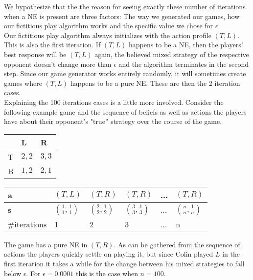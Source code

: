 \documentclass[10pt,a4paper]{article}
\begin{document}
We hypothesize that the the reason for seeing exactly these number of iterations when a NE is present are three factors: The way we generated our games, how our fictitious play algorithm works and the specific value we chose for $\epsilon$.\\
Our fictitious play algorithm always initializes with the action profile $(T,L)$. This is also the first iteration. If $(T,L)$ happens to be a NE, then the players' best response will be $(T,L)$ again, the believed mixed strategy of the respective opponent doesn't change more than $\epsilon$ and the algorithm terminates in the second step. Since our game generator works entirely randomly, it will sometimes create games where $(T,L)$ happens to be a pure NE. These are then the 2 iteration cases.\\
Explaining the 100 iterations cases is a little more involved. Consider the following example game and the sequence of beliefs as well as actions the players have about their opponent's "true'' strategy over the course of the game.
\begin{table}[h]
\centering
\begin{tabular}{|l|l|l|}
\hline
  & L                & R                \\ \hline
T & $2,2$ & $3,3$   \\ \hline
B & $1,2$ & $2,1$ \\ \hline
\end{tabular}
\end{table}
\begin{table}[h]
\centering
\begin{tabular}{|l|l|l|l|l|l|}
\hline
\textbf{a} & $(T,L)$ & $(T,R)$ & $(T,R)$ & ... & $(T,R)$           \\ \hline
\textbf{s} & $(\tfrac{1}{1},\tfrac{1}{1})$   & $(\tfrac{2}{2},\tfrac{1}{2})$  & $(\tfrac{3}{3},\tfrac{1}{3})$ & ... & $(\tfrac{n}{n},\tfrac{1}{n})$ \\ \hline
\#iterations & 1       & 2 &  3  & ... & n      \\ \hline
\end{tabular}
\end{table}
The game has a pure NE in $(T,R)$. As can be gathered from the sequence of actions the players quickly settle on playing it, but since Colin played $L$ in the first iteration it takes a while for the change between his mixed strategies to fall below $\epsilon$. For $\epsilon=0.0001$ this is the case when $n=100$.
\end{document}
